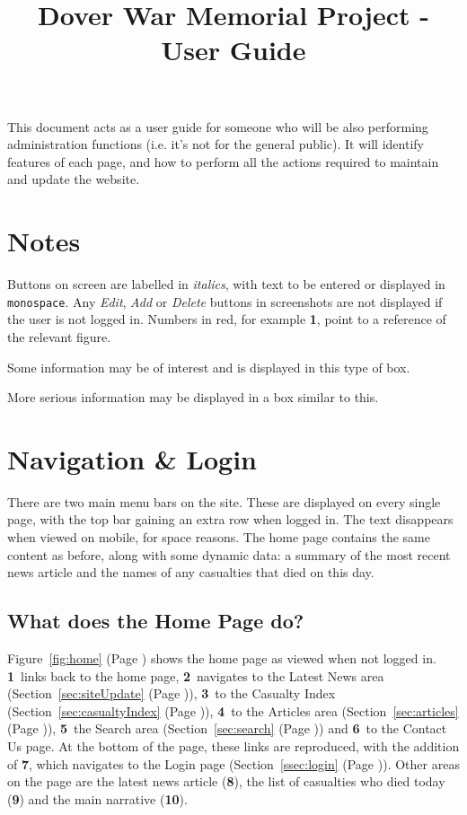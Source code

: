 \documentclass[12pt]{article}
\title{\vspace{-1cm}\textbf{Dover War Memorial Project - User Guide}\vspace{-1cm}}
\date{}
\author{}
\newcommand{\marker}[1]{\color{red}\textbf{#1}\color{black}}
\newcommand{\myref}[1]{\ref{#1} {\scriptsize(Page \pageref{#1})}}
\begin{document}
\maketitle

This document acts as a user guide for someone who will be also performing administration functions (i.e. it's not for the general public). It will identify features of each page, and how to perform all the actions required to maintain and update the website.

\tableofcontents

\section{Notes}
Buttons on screen are labelled in \textit{italics}, with text to be entered or displayed in \texttt{monospace}. Any \textit{Edit}, \textit{Add} or \textit{Delete} buttons in screenshots are not displayed if the user is not logged in. Numbers in red, for example \marker{1}, point to a reference of the relevant figure.

\begin{infoBox}
Some information may be of interest and is displayed in this type of box.
\end{infoBox}

\begin{warningBox}
More serious information may be displayed in a box similar to this.
\end{warningBox}

\newpage

\section{Navigation \& Login}
There are two main menu bars on the site. These are displayed on every single page, with the top bar gaining an extra row when logged in. The text disappears when viewed on mobile, for space reasons. The home page contains the same content as before, along with some dynamic data: a summary of the most recent news article and the names of any casualties that died on this day.

\subsection{What does the Home Page do?}
Figure~\myref{fig:home} shows the home page as viewed when not logged in. \marker{1}\ links back to the home page, \marker{2}\ navigates to the Latest News area (Section~\myref{sec:siteUpdate}), \marker{3}\ to the Casualty Index (Section~\myref{sec:casualtyIndex}), \marker{4}\ to the Articles area (Section~\myref{sec:articles}), \marker{5}\ the Search area (Section~\myref{sec:search}) and \marker{6}\ to the Contact Us page. At the bottom of the page, these links are reproduced, with the addition of \marker{7}, which navigates to the Login page (Section~\myref{ssec:login}). Other areas on the page are the latest news article (\marker{8}), the list of casualties who died today (\marker{9}) and the main narrative (\marker{10}).
\end{document}
